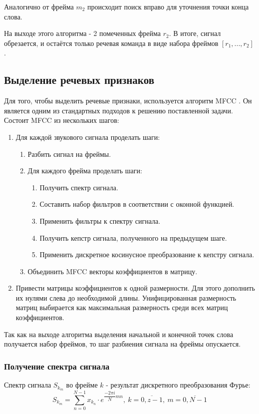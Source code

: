 Аналогично от фрейма $m_2$ происходит поиск вправо для уточнения точки конца слова.

На выходе этого алгоритма - 2 помеченных фрейма $r_2$. В итоге, сигнал обрезается, и остаётся только речевая команда в виде набора фреймов $[r_1, ... , r_2]$.  

\subsection{Выделение речевых признаков}
Для того, чтобы выделить речевые признаки, используется алгоритм MFCC \cite{MFCC}. Он является одним из стандартных подходов к решению поставленной задачи. Состоит MFCC из нескольких шагов:
\begin{enumerate}
	\item Для каждой звукового сигнала проделать шаги:
	\begin{enumerate}
		\item Разбить сигнал на фреймы.
		\item Для каждого фрейма проделать шаги:
		\begin{enumerate}
			\item Получить спектр сигнала.
			\item Составить набор фильтров в соответствии с оконной функцией.
			\item Применить фильтры к спектру сигнала.
			\item Получить кепстр сигнала, полученного на предыдущем шаге.
			\item Применить дискретное косинусное преобразование к кепстру сигнала.
		\end{enumerate}
		\item Объединить MFCC векторы коэффициентов в матрицу.
	\end{enumerate}

	\item Привести матрицы коэффициентов к одной размерности. Для этого дополнить их нулями слева до необходимой длины. Унифицированная размерность матриц выбирается как максимальная размерность среди всех матриц коэффициентов.
\end{enumerate}
  
Так как на выходе алгоритма выделения начальной и конечной точек слова получается набор фреймов, то шаг разбиения сигнала на фреймы опускается.

\subsubsection{Получение спектра сигнала}
Спектр сигнала $S_{k_m}$ во фрейме $k$ - результат дискретного преобразования Фурье:
\begin{equation}
	S_{k_m} = \sum_{n=0}^{N-1} x_{k_n} \cdot e^{\dfrac{-2\pi i}{N}mn},~k=\overline{0,z-1},~m=\overline{0,N-1}
\end{equation}

